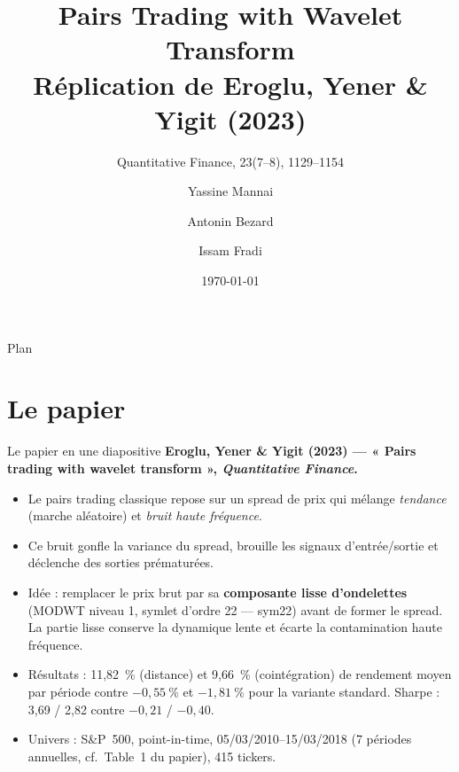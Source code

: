 \documentclass[10pt,aspectratio=169]{beamer}
\title[Pairs Trading with Wavelet Transform]{Pairs Trading with Wavelet Transform\\\small{Réplication de Eroglu, Yener \& Yigit (2023)}}
\subtitle{Quantitative Finance, 23(7--8), 1129--1154}
\author{Yassine Mannai \and Antonin Bezard \and Issam Fradi}
\institute{Université Paris-Dauphine --- Master 272\\Arbitrage Statistique}
\date{\today}
\begin{document}
\begin{frame}
  \titlepage
\end{frame}

\begin{frame}{Plan}
  \tableofcontents
\end{frame}

\section{Le papier}
\begin{frame}{Le papier en une diapositive}
  \textbf{Eroglu, Yener \& Yigit (2023) --- « Pairs trading with wavelet transform », \textit{Quantitative Finance}.}
  \vskip4pt
  \begin{itemize}
    \item Le pairs trading classique repose sur un spread de prix qui mélange
          \emph{tendance} (marche aléatoire) et \emph{bruit haute fréquence}.
    \item Ce bruit gonfle la variance du spread, brouille les signaux
          d'entrée/sortie et déclenche des sorties prématurées.
    \item Idée : remplacer le prix brut par sa \textbf{composante lisse
          d'ondelettes} (MODWT niveau 1, symlet d'ordre 22 --- sym22) avant
          de former le spread. La partie lisse conserve la dynamique lente et
          écarte la contamination haute fréquence.
    \item Résultats : 11{,}82~\% (distance) et 9{,}66~\% (cointégration) de
          rendement moyen par période contre $-0{,}55~\%$ et $-1{,}81~\%$
          pour la variante standard. Sharpe : 3{,}69 / 2{,}82 contre
          $-0{,}21$ / $-0{,}40$.
    \item Univers : S\&P~500, point-in-time, 05/03/2010--15/03/2018 (7 périodes annuelles, cf.~Table~1 du papier), 415 tickers.
  \end{itemize}
\end{frame}

\end{document}
